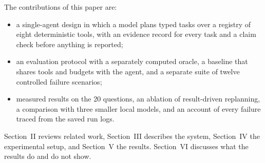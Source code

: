 The contributions of this paper are:
\begin{itemize}
\item a single-agent design in which a model plans typed tasks over a registry of eight deterministic tools, with an evidence record for every task and a claim check before anything is reported;
\item an evaluation protocol with a separately computed oracle, a baseline that shares tools and budgets with the agent, and a separate suite of twelve controlled failure scenarios;
\item measured results on the 20 questions, an ablation of result-driven replanning, a comparison with three smaller local models, and an account of every failure traced from the saved run logs.
\end{itemize}
Section~II reviews related work, Section~III describes the system, Section~IV the experimental setup, and Section~V the results. Section~VI discusses what the results do and do not show.
